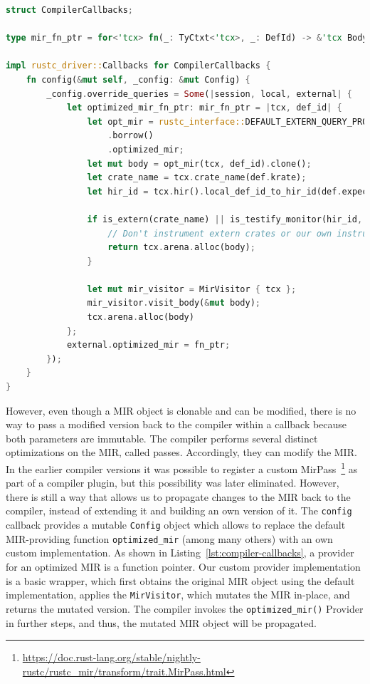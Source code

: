 \documentclass{article}
\begin{document}
\begin{lstlisting}[language=Rust, style=boxed, caption={The Rust compiler interface accepts an object which implements its callback trait, allowing us to execute code at different compilation phases}, label=lst:compiler-callbacks]
struct CompilerCallbacks;

type mir_fn_ptr = for<'tcx> fn(_: TyCtxt<'tcx>, _: DefId) -> &'tcx Body<'tcx>;

impl rustc_driver::Callbacks for CompilerCallbacks {
    fn config(&mut self, _config: &mut Config) {
        _config.override_queries = Some(|session, local, external| {
            let optimized_mir_fn_ptr: mir_fn_ptr = |tcx, def_id| {
                let opt_mir = rustc_interface::DEFAULT_EXTERN_QUERY_PROVIDERS
                    .borrow()
                    .optimized_mir;
                let mut body = opt_mir(tcx, def_id).clone();
                let crate_name = tcx.crate_name(def.krate);
                let hir_id = tcx.hir().local_def_id_to_hir_id(def.expect_local());

                if is_extern(crate_name) || is_testify_monitor(hir_id, &tcx) {
                    // Don't instrument extern crates or our own instrumentation code
                    return tcx.arena.alloc(body);
                }

                let mut mir_visitor = MirVisitor { tcx };
                mir_visitor.visit_body(&mut body);
                tcx.arena.alloc(body)
            };
            external.optimized_mir = fn_ptr;
        });
    }
}
\end{lstlisting}
However, even though a \ac{MIR} object is clonable and can be modified, there is no way to pass a modified version back to the compiler within a callback because both parameters are immutable. The compiler performs several distinct optimizations on the MIR, called passes. Accordingly, they can modify the MIR. In the earlier compiler versions it was possible to register a custom MirPass~\footnote{\url{https://doc.rust-lang.org/stable/nightly-rustc/rustc_mir/transform/trait.MirPass.html}} as part of a compiler plugin, but this possibility was later eliminated. However, there is still a way that allows us to propagate changes to the MIR back to the compiler, instead of extending it and building an own version of it. The \lstinline{config} callback provides a mutable \lstinline{Config} object which allows to replace the default \ac{MIR}-providing function \lstinline{optimized_mir} (among many others) with an own custom implementation. As shown in Listing~\ref{lst:compiler-callbacks}, a provider for an optimized \ac{MIR} is a function pointer. Our custom provider implementation is a basic wrapper, which first obtains the original \ac{MIR} object using the default implementation, applies the \lstinline{MirVisitor}, which mutates the MIR in-place, and returns the mutated version. The compiler invokes the \lstinline{optimized_mir()} Provider in further steps, and thus, the mutated \ac{MIR} object will be propagated. 
\end{document}
